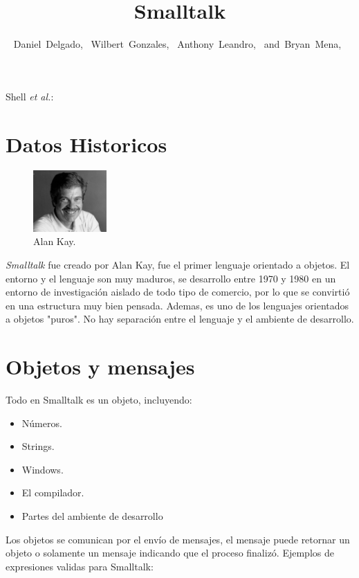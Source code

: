 \documentclass[10pt,journal,compsoc]{IEEEtran}
\begin{document}
\title{Smalltalk}

\author{Daniel~Delgado,~
	Wilbert~Gonzales,~
	Anthony~Leandro,~
	and~Bryan~Mena,~
}
{Shell \MakeLowercase{\textit{et al.}}: \LaTex}


\maketitle

\IEEEdisplaynontitleabstractindextext

\IEEEpeerreviewmaketitle

\section{Datos Historicos}
\begin{figure}
	\centering
	\includegraphics[width=0.25\textwidth]{Smalltalk.jpg}
	\caption{\label{fig:NiklausWirth}Alan Kay.}
\end{figure}
\emph{Smalltalk} fue creado por Alan Kay, fue el primer lenguaje orientado a objetos. El entorno y el lenguaje son muy maduros, se desarrollo entre 1970 y 1980 en un entorno de investigaci\'on aislado de todo tipo de comercio, por lo que se convirti\'o en una estructura muy bien pensada. Ademas, es uno de los lenguajes orientados a objetos "puros". No hay separaci\'on entre el lenguaje y el ambiente de desarrollo.


\section{Objetos y mensajes}
Todo en Smalltalk es un objeto, incluyendo: 
\begin{itemize}
	\item N\'umeros.
	\item Strings.
	\item Windows.
	\item El compilador.
	\item Partes del ambiente de desarrollo 
\end{itemize}
Los objetos se comunican por el env\'io de mensajes, el mensaje puede retornar un objeto o solamente un mensaje indicando que el proceso finaliz\'o. Ejemplos de expresiones validas para Smalltalk:\newline
\end{document}

